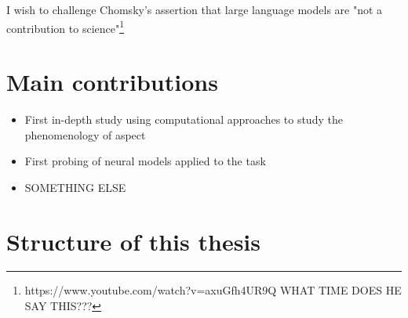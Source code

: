 I wish to challenge Chomsky's assertion that large language models are "not a contribution to science"\footnote{https://www.youtube.com/watch?v=axuGfh4UR9Q WHAT TIME DOES HE SAY THIS???}

\section*{Main contributions}
\begin{itemize}
    \item First in-depth study using computational approaches to study the phenomenology of aspect 
    \item First probing of neural models applied to the task
    \item SOMETHING ELSE
\end{itemize}
\section*{Structure of this thesis}